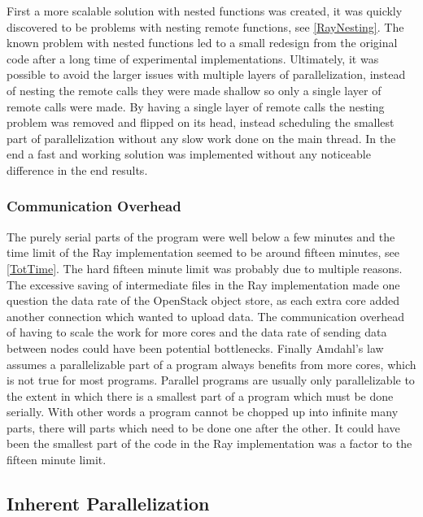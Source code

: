 \documentclass[12pt, a4paper]{article}
\begin{document}
First a more scalable solution with nested functions was created, it was quickly discovered to be problems with nesting remote functions, see \cref{RayNesting}.
The known problem with nested functions led to a small redesign from the original code after a long time of experimental implementations. 
Ultimately, it was possible to avoid the larger issues with multiple layers of parallelization, instead of nesting the remote calls they were made shallow so only a single layer of remote calls were made.
By having a single layer of remote calls the nesting problem was removed and flipped on its head, instead scheduling the smallest part of parallelization without any slow work done on the main thread.
In the end a fast and working solution was implemented without any noticeable difference in the end results.

\subsubsection{Communication Overhead}

The purely serial parts of the program were well below a few minutes and the time limit of the Ray implementation seemed to be around fifteen minutes, see \cref{TotTime}.
The hard fifteen minute limit was probably due to multiple reasons.
The excessive saving of intermediate files in the Ray implementation made one question the data rate of the OpenStack object store, as each extra core added another connection which wanted to upload data. 
The communication overhead of having to scale the work for more cores and the data rate of sending data between nodes could have been potential bottlenecks.
Finally Amdahl's law assumes a parallelizable part of a program always benefits from more cores, which is not true for most programs.
Parallel programs are usually only parallelizable to the extent in which there is a smallest part of a program which must be done serially.
With other words a program cannot be chopped up into infinite many parts, there will parts which need to be done one after the other.
It could have been the smallest part of the code in the Ray implementation was a factor to the fifteen minute limit.

\subsection{Inherent Parallelization}\label{inPara}
\end{document}
